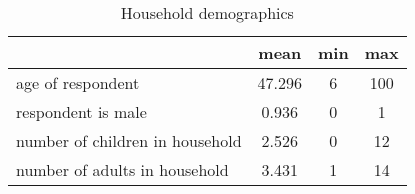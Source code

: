 \begin{table}[htbp]\centering
\def\sym#1{\ifmmode^{#1}\else\(^{#1}\)\fi}
\caption{Household demographics \label{tab:"label"}}
\begin{tabular*}{0.9\hsize}{@{\hskip\tabcolsep\extracolsep\fill}l*{1}{ccc}}
\toprule
                                &     mean&      min&      max\\
\midrule
age of respondent               &   47.296&        6&      100\\
respondent is male              &    0.936&        0&        1\\
number of children in household &    2.526&        0&       12\\
number of adults in household   &    3.431&        1&       14\\
\bottomrule
\end{tabular*}
\end{table}
